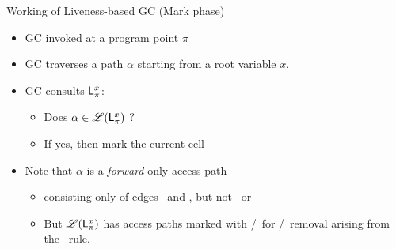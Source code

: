 \documentclass[xcolor=x11names,compress,mathserif]{beamer}
\renewcommand{\(}{\begin{columns}}
\renewcommand{\)}{\end{columns}}
\newcommand{\<}[1]{\begin{column}{#1}}
\renewcommand{\>}{\end{column}}
\begin{document}

\begin{frame}{Working of Liveness-based GC (Mark phase)}
  \begin{itemize}
  \item GC invoked at a program point $\pi$
  \item GC traverses a path $\alpha$ starting from a root variable $x$.
  \item GC consults $\mathsf{L}_{{\pi}}^{x}$: 
    \begin{itemize}
    \item Does $\alpha \in \mathscr{L}(\mathsf{L}_{{\pi}}^{x})$ ?
    \item If yes, then mark the current cell
    \end{itemize}
    \pause
  \item  Note  that  $\alpha$  is a  {\em  forward}-only  access  path
    \begin{itemize}
    \item consisting  only of  edges \acar\  and \acdr,  but not  \bcar\ or
      \bcdr
    \item But $\mathscr{L}(\mathsf{L}_{{\pi}}^{x})$ has access paths marked with \bcar/\bcdr\ for \acar/\acdr\  removal
  arising from the \CONS\  rule.
    \end{itemize}
  \end{itemize}
\end{frame}
\end{document}
